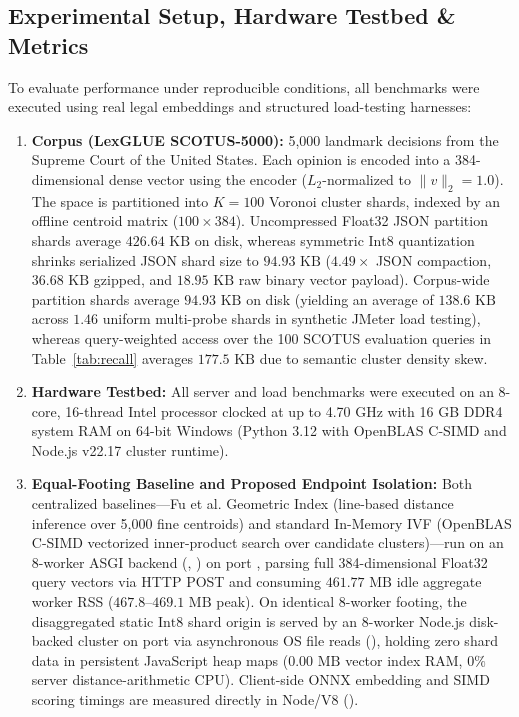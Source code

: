 \documentclass[11pt,journal,compsoc,onecolumn]{IEEEtran}
\begin{document}
\subsection{Experimental Setup, Hardware Testbed \& Metrics}
To evaluate performance under reproducible conditions, all benchmarks were executed using real legal embeddings and structured load-testing harnesses:
\begin{enumerate}
    \item \textbf{Corpus (LexGLUE SCOTUS-5000):} 5,000 landmark decisions from the Supreme Court of the United States. Each opinion is encoded into a 384-dimensional dense vector using the  encoder ($L_2$-normalized to $\|v\|_2 = 1.0$). The space is partitioned into $K = 100$ Voronoi cluster shards, indexed by an offline centroid matrix ($100 \times 384$). Uncompressed Float32 JSON partition shards average $426.64\text{ KB}$ on disk, whereas symmetric $\text{Int8}$ quantization shrinks serialized JSON shard size to $94.93\text{ KB}$ ($4.49\times$ JSON compaction, $36.68\text{ KB}$ gzipped, and $18.95\text{ KB}$ raw binary vector payload). Corpus-wide partition shards average $94.93\text{ KB}$ on disk (yielding an average of $138.6\text{ KB}$ across $1.46$ uniform multi-probe shards in synthetic JMeter load testing), whereas query-weighted access over the 100 SCOTUS evaluation queries in Table~\ref{tab:recall} averages $177.5\text{ KB}$ due to semantic cluster density skew.
    \item \textbf{Hardware Testbed:} All server and load benchmarks were executed on an 8-core, 16-thread Intel processor clocked at up to 4.70 GHz with 16 GB DDR4 system RAM on 64-bit Windows (Python 3.12 with OpenBLAS C-SIMD and Node.js v22.17 cluster runtime).
    \item \textbf{Equal-Footing Baseline and Proposed Endpoint Isolation:} Both centralized baselines---Fu et al. \cite{fu2026geometric} Geometric Index (line-based distance inference over 5,000 fine centroids) and standard In-Memory IVF (OpenBLAS C-SIMD vectorized inner-product search over candidate clusters)---run on an 8-worker ASGI backend (, ) on port , parsing full 384-dimensional Float32 query vectors via HTTP POST and consuming $461.77\text{ MB}$ idle aggregate worker RSS ($467.8\text{--}469.1\text{ MB}$ peak). On identical 8-worker footing, the disaggregated static $\text{Int8}$ shard origin is served by an 8-worker Node.js disk-backed cluster on port  via asynchronous OS file reads (), holding zero shard data in persistent JavaScript heap maps ($0.00\text{ MB}$ vector index RAM, $0\%$ server distance-arithmetic CPU). Client-side ONNX embedding and SIMD scoring timings are measured directly in Node/V8 ().

\end{enumerate}
\end{document}
